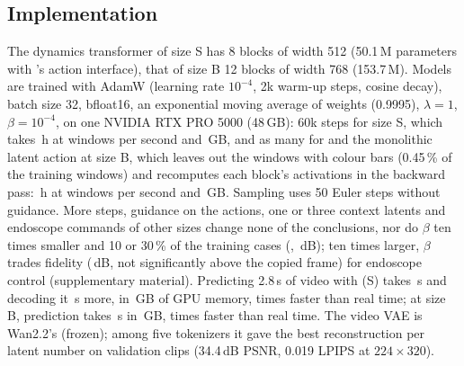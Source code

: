 \subsection{Implementation}
The dynamics transformer of size S has 8 blocks of width 512 (50.1\,M parameters with \method{}'s action interface), that of size B 12 blocks of width 768 (153.7\,M). Models are trained with AdamW (learning rate $10^{-4}$, 2k warm-up steps, cosine decay), batch size 32, bfloat16, an exponential moving average of weights (0.9995), $\lambda=1$, $\beta=10^{-4}$, on one NVIDIA RTX PRO 5000 (48\,GB): 60k steps for size S, which takes \,h at  windows per second and \,GB, and as many for \method{} and the monolithic latent action at size B, which leaves out the windows with colour bars (0.45\,\% of the training windows) and recomputes each block's activations in the backward pass: \,h at  windows per second and \,GB. Sampling uses 50 Euler steps without guidance. More steps, guidance on the actions, one or three context latents and endoscope commands of other sizes change none of the conclusions, nor do $\beta$ ten times smaller and 10 or 30\,\% of the training cases (, \,dB); ten times larger, $\beta$ trades fidelity (\,dB, not significantly above the copied frame) for endoscope control (supplementary material). Predicting 2.8\,s of video with \method{} (S) takes \,s and decoding it \,s more, in \,GB of GPU memory,  times faster than real time; at size B, prediction takes \,s in \,GB,  times faster than real time. The video VAE is Wan2.2's (frozen); among five tokenizers it gave the best reconstruction per latent number on validation clips (34.4\,dB PSNR, 0.019 LPIPS at $224\times320$).
